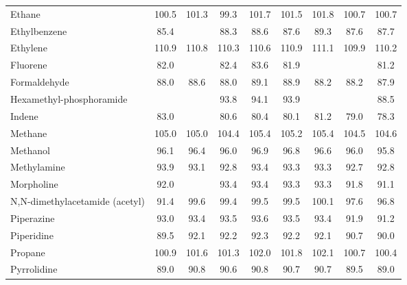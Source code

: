 \begin{longtable}{m{3.1cm} | c c c c c c c c}
Ethane                           & 100.5     &  101.3   &   99.3   &   101.7     &   101.5    &  101.8   & 100.7   &   100.7   \\
Ethylbenzene                     &  85.4     &          &   88.3   &    88.6     &    87.6    &   89.3   &  87.6   &    87.7   \\
Ethylene                         & 110.9     &  110.8   &  110.3   &   110.6     &   110.9    &  111.1   & 109.9   &   110.2   \\
Fluorene                         &  82.0     &          &   82.4   &    83.6     &    81.9    &          &         &    81.2   \\
Formaldehyde                     &  88.0     &   88.6   &   88.0   &    89.1     &    88.9    &   88.2   &  88.2   &    87.9   \\
Hexamethyl-phosphoramide         &           &          &   93.8   &    94.1     &    93.9    &          &         &    88.5   \\
Indene                           &  83.0     &          &   80.6   &    80.4     &    80.1    &   81.2   &  79.0   &    78.3   \\
Methane                          & 105.0     &  105.0   &  104.4   &   105.4     &   105.2    &  105.4   & 104.5   &   104.6   \\
Methanol                         &  96.1     &   96.4   &   96.0   &    96.9     &    96.8    &   96.6   &  96.0   &    95.8   \\
Methylamine                      &  93.9     &   93.1   &   92.8   &    93.4     &    93.3    &   93.3   &  92.7   &    92.8   \\
Morpholine                       &  92.0     &          &   93.4   &    93.4     &    93.3    &   93.3   &  91.8   &    91.1   \\
N,N-dimethylacetamide (acetyl)   &  91.4     &   99.6   &   99.4   &    99.5     &    99.5    &  100.1   &  97.6   &    96.8   \\
Piperazine                       &  93.0     &   93.4   &   93.5   &    93.6     &    93.5    &   93.4   &  91.9   &    91.2   \\
Piperidine                       &  89.5     &   92.1   &   92.2   &    92.3     &    92.2    &   92.1   &  90.7   &    90.0   \\
Propane                          & 100.9     &  101.6   &  101.3   &   102.0     &   101.8    &  102.1   & 100.7   &   100.4   \\
Pyrrolidine                      &  89.0     &   90.8   &   90.6   &    90.8     &    90.7    &   90.7   &  89.5   &    89.0   \\

\end{longtable}
